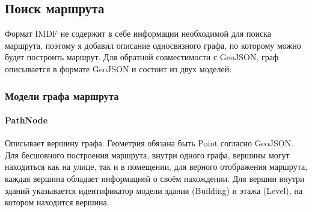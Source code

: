     \subsection{Поиск маршрута}
      Формат IMDF не содержит в себе информации необходимой для поиска маршрута, поэтому я добавил описание односвязного графа, по которому можно будет построить маршрут. Для обратной совместимости с GeoJSON, граф описывается в формате GeoJSON и состоит из двух моделей:
      \subsubsection{Модели графа маршрута}
        \paragraph{PathNode}
          Описывает вершину графа. Геометрия обязана быть Point согласно GeoJSON. Для бесшовного построения маршрута, внутри одного графа, вершины могут находиться как на улице, так и в помещении, для верного отображения маршрута, каждая вершина обладает информацией о своём нахождении. Для вершин внутри зданий указывается идентификатор модели здания (Building) и этажа (Level), на котором находится вершина.
